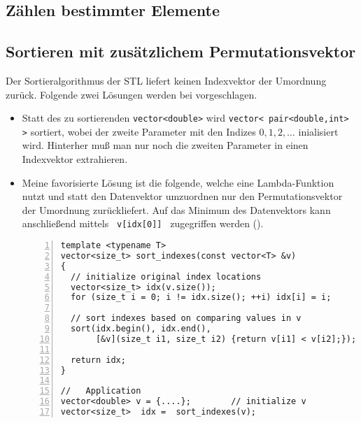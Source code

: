 %
%
\subsection{Zählen bestimmter Elemente}
\label{p:11.3.6}
%
%
%
%
%

%
%
\subsection{Sortieren mit zusätzlichem Permutationsvektor}
\label{p:11.3.7}
% 
Der Sortieralgorithmus der STL liefert keinen Indexvektor der Umordnung zurück.
Folgende zwei Lösungen werden bei 
vorgeschlagen.
\begin{itemize}
    \item Statt des zu sortierenden \verb|vector<double>| wird 
       \verb|vector< pair<double,int> >| sortiert, wobei der zweite Parameter mit den Indizes $0,1,2,\ldots$ 
       inialisiert wird. 
       Hinterher muß man nur noch die zweiten Parameter in einen Indexvektor extrahieren.
    \item Meine favorisierte Lösung ist die folgende, welche eine Lambda-Funktion nutzt und 
    statt den Datenvektor umzuordnen nur den Permutationsvektor der Umordnung zurückliefert. 
    Auf das Minimum des Datenvektors kann anschließend mittels \verb| v[idx[0]] | zugegriffen werden ().
\begin{lstlisting}[caption={Sortieren mit Permutationsvektor},label=lst:sort_permutvektor,
basicstyle=\scriptsize,numbers=left, numberstyle=\tiny, stepnumber=2, numbersep=5pt]
template <typename T>
vector<size_t> sort_indexes(const vector<T> &v) 
{
  // initialize original index locations
  vector<size_t> idx(v.size());
  for (size_t i = 0; i != idx.size(); ++i) idx[i] = i;

  // sort indexes based on comparing values in v
  sort(idx.begin(), idx.end(),
       [&v](size_t i1, size_t i2) {return v[i1] < v[i2];});

  return idx;
}

//   Application
vector<double> v = {....};        // initialize v
vector<size_t>  idx =  sort_indexes(v);
\end{lstlisting}    
\end{itemize}


